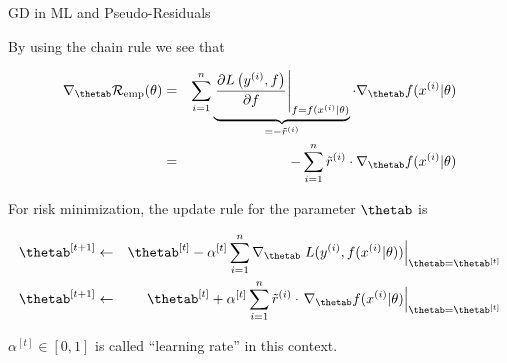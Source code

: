 \begin{vbframe}{GD in ML and Pseudo-Residuals}

By using the chain rule we see that 

\vspace*{-0.5cm}

\begin{footnotesize}
\begin{eqnarray*}
\nabla_{\thetab} \risket &=&\sumin \underbrace{\left.\frac{\partial L\left(\yi, f\right)}{\partial f} \right|_{f = \fxit} }_{= - \tilde r^{(i)}}
\cdot \nabla_{\thetab} \fxit \\ 
&=& - \sumin \tilde r^{(i)} \cdot \nabla_{\thetab} \fxit
\end{eqnarray*}
\end{footnotesize}

For risk minimization, the update rule for the parameter $\thetab$ is 
\begin{footnotesize}
\begin{eqnarray*}
\thetab^{[t+1]} &\leftarrow & \thetab^{[t]} - \alpha^{[t]}  \sumin \nabla_{\thetab} \left. \Lxyit \right|_{\thetab = \thetab^{[t]}} \\
\thetab^{[t+1]} &\leftarrow & \thetab^{[t]} + \alpha^{[t]} \sumin \tilde r^{(i)} \cdot \left. \nabla_{\thetab} \fxit \right|_{\thetab = \thetab^{[t]}} 
\end{eqnarray*}
\end{footnotesize}
$\alpha^{[t]} \in [0,1]$ is called \enquote{learning rate} in this context.
\end{vbframe}





\endlecture

